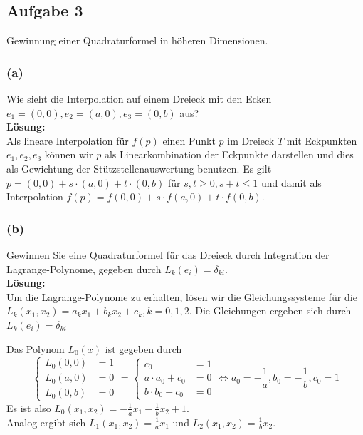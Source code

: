 \documentclass[11pt,a4paper,ngerman]{article}
\begin{document}
\newpage
\subsection*{Aufgabe 3}

Gewinnung einer Quadraturformel in höheren Dimensionen.

\subsubsection*{(a)}
Wie sieht die Interpolation auf einem Dreieck mit den Ecken $e_1 = (0,0), e_2 = (a,0), e_3 = (0,b)$ aus?\\

\textbf{Lösung:}\\
Als lineare Interpolation für $f(p)$ einen Punkt $p$ im Dreieck $T$ mit Eckpunkten $e_1, e_2, e_3$ können wir
$p$ als Linearkombination der Eckpunkte darstellen und dies als Gewichtung der Stützstellenauswertung benutzen.
Es gilt $p = (0,0) + s \cdot (a,0) + t \cdot (0,b)$ für $s,t \geq 0, s + t \leq 1$ und damit als Interpolation
$f(p) = f(0,0) + s \cdot f(a,0) + t \cdot f(0,b)$.

\subsubsection*{(b)}
Gewinnen Sie eine Quadraturformel für das Dreieck durch Integration der Lagrange-Polynome, gegeben
durch $L_k(e_i) = \delta_{ki}$.\\

\textbf{Lösung:}\\
Um die Lagrange-Polynome zu erhalten, lösen wir die Gleichungssysteme für die $L_k(x_1,x_2) = a_k x_1 + b_k x_2 + c_k, k = 0,1,2$. Die Gleichungen ergeben sich durch $L_k(e_i) = \delta_{ki}$

Das Polynom $L_0(x)$ ist gegeben durch
\begin{equation*}
\begin{cases}
  L_0(0,0) &= 1 \\
  L_0(a,0) &= 0 \\
  L_0(0,b) &= 0
\end{cases}
= \begin{cases}
  c_0 &= 1 \\
  a \cdot a_0 + c_0 &= 0 \\
  b\cdot b_0 + c_0 &= 0
\end{cases}
\Leftrightarrow
a_0 = -\frac{1}{a}, b_0 = -\frac{1}{b}, c_0 = 1
\end{equation*}
Es ist also $L_0(x_1,x_2) = -\frac{1}{a} x_1 -\frac{1}{b}x_2 + 1$. \\
Analog ergibt sich $L_1(x_1,x_2) = \frac{1}{a} x_1$ und $L_2(x_1,x_2) = \frac{1}{b}x_2$.
%
\end{document}
